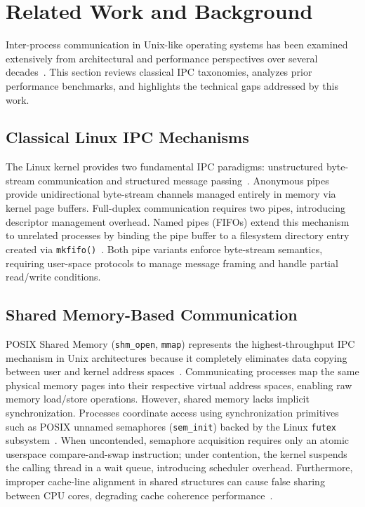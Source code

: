 \section{Related Work and Background}
\label{sec:related_work}

Inter-process communication in Unix-like operating systems has been examined extensively from architectural and performance perspectives over several decades~\cite{silberschatz2018operating,kerrisk2010linux}. This section reviews classical IPC taxonomies, analyzes prior performance benchmarks, and highlights the technical gaps addressed by this work.

\subsection{Classical Linux IPC Mechanisms}
The Linux kernel provides two fundamental IPC paradigms: unstructured byte-stream communication and structured message passing~\cite{kerrisk2010linux,stevens1999unixipc}. Anonymous pipes provide unidirectional byte-stream channels managed entirely in memory via kernel page buffers. Full-duplex communication requires two pipes, introducing descriptor management overhead. Named pipes (FIFOs) extend this mechanism to unrelated processes by binding the pipe buffer to a filesystem directory entry created via \texttt{mkfifo()}~\cite{kerrisk2010linux}. Both pipe variants enforce byte-stream semantics, requiring user-space protocols to manage message framing and handle partial read/write conditions.

\subsection{Shared Memory-Based Communication}
POSIX Shared Memory (\texttt{shm\_open}, \texttt{mmap}) represents the highest-throughput IPC mechanism in Unix architectures because it completely eliminates data copying between user and kernel address spaces~\cite{posix2018standard,stevens1999unixipc}. Communicating processes map the same physical memory pages into their respective virtual address spaces, enabling raw memory load/store operations.
However, shared memory lacks implicit synchronization. Processes coordinate access using synchronization primitives such as POSIX unnamed semaphores (\texttt{sem\_init}) backed by the Linux \texttt{futex} subsystem~\cite{franke2002futex}. When uncontended, semaphore acquisition requires only an atomic userspace compare-and-swap instruction; under contention, the kernel suspends the calling thread in a wait queue, introducing scheduler overhead. Furthermore, improper cache-line alignment in shared structures can cause false sharing between CPU cores, degrading cache coherence performance~\cite{herlihy2020art,drepper2007every}.

